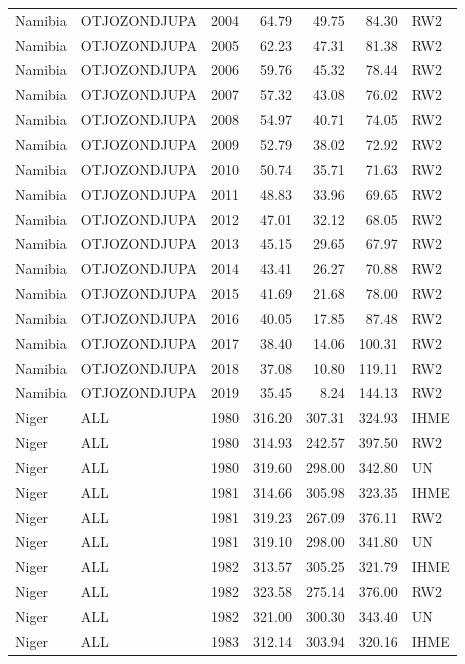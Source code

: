 \begin{longtable}{lllrrrl}
  Namibia & OTJOZONDJUPA & 2004 & 64.79 & 49.75 & 84.30 & RW2 \\ 
  Namibia & OTJOZONDJUPA & 2005 & 62.23 & 47.31 & 81.38 & RW2 \\ 
  Namibia & OTJOZONDJUPA & 2006 & 59.76 & 45.32 & 78.44 & RW2 \\ 
  Namibia & OTJOZONDJUPA & 2007 & 57.32 & 43.08 & 76.02 & RW2 \\ 
  Namibia & OTJOZONDJUPA & 2008 & 54.97 & 40.71 & 74.05 & RW2 \\ 
  Namibia & OTJOZONDJUPA & 2009 & 52.79 & 38.02 & 72.92 & RW2 \\ 
  Namibia & OTJOZONDJUPA & 2010 & 50.74 & 35.71 & 71.63 & RW2 \\ 
  Namibia & OTJOZONDJUPA & 2011 & 48.83 & 33.96 & 69.65 & RW2 \\ 
  Namibia & OTJOZONDJUPA & 2012 & 47.01 & 32.12 & 68.05 & RW2 \\ 
  Namibia & OTJOZONDJUPA & 2013 & 45.15 & 29.65 & 67.97 & RW2 \\ 
  Namibia & OTJOZONDJUPA & 2014 & 43.41 & 26.27 & 70.88 & RW2 \\ 
  Namibia & OTJOZONDJUPA & 2015 & 41.69 & 21.68 & 78.00 & RW2 \\ 
  Namibia & OTJOZONDJUPA & 2016 & 40.05 & 17.85 & 87.48 & RW2 \\ 
  Namibia & OTJOZONDJUPA & 2017 & 38.40 & 14.06 & 100.31 & RW2 \\ 
  Namibia & OTJOZONDJUPA & 2018 & 37.08 & 10.80 & 119.11 & RW2 \\ 
  Namibia & OTJOZONDJUPA & 2019 & 35.45 & 8.24 & 144.13 & RW2 \\ 
  Niger & ALL & 1980 & 316.20 & 307.31 & 324.93 & IHME \\ 
  Niger & ALL & 1980 & 314.93 & 242.57 & 397.50 & RW2 \\ 
  Niger & ALL & 1980 & 319.60 & 298.00 & 342.80 & UN \\ 
  Niger & ALL & 1981 & 314.66 & 305.98 & 323.35 & IHME \\ 
  Niger & ALL & 1981 & 319.23 & 267.09 & 376.11 & RW2 \\ 
  Niger & ALL & 1981 & 319.10 & 298.00 & 341.80 & UN \\ 
  Niger & ALL & 1982 & 313.57 & 305.25 & 321.79 & IHME \\ 
  Niger & ALL & 1982 & 323.58 & 275.14 & 376.00 & RW2 \\ 
  Niger & ALL & 1982 & 321.00 & 300.30 & 343.40 & UN \\ 
  Niger & ALL & 1983 & 312.14 & 303.94 & 320.16 & IHME \\ 

\end{longtable}
